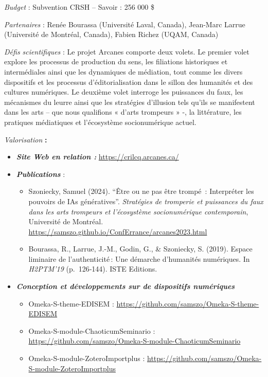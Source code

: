 \documentclass[
  a4paper,
  DIV=11,
  numbers=noendperiod]{scrreprt}
\begin{document}
\emph{Budget} : Subvention CRSH -- Savoir : 256 000 \$

\emph{Partenaires} : Renée Bourassa (Université Laval, Canada),
Jean-Marc Larrue (Université de Montréal, Canada), Fabien Richez (UQAM,
Canada)

\emph{Défis scientifiques} : Le projet Arcanes comporte deux volets. Le
premier volet explore les processus de production du sens, les
filiations historiques et intermédiales ainsi que les dynamiques de
médiation, tout comme les divers dispositifs et les processus
d'éditorialisation dans le sillon des humanités et des cultures
numériques. Le deuxième volet interroge les puissances du faux, les
mécanismes du leurre ainsi que les stratégies d'illusion tels qu'ils se
manifestent dans les arts -- que nous qualifions « d'arts trompeurs » -,
la littérature, les pratiques médiatiques et l'écosystème socionumérique
actuel.

\emph{Valorisation} \textbf{:}

\begin{itemize}
\item
  \textbf{\emph{Site Web en relation :}}
  \url{https://crilcq.arcanes.ca/}
\item
  \textbf{\emph{Publications}} :

  \begin{itemize}
  \item
    Szoniecky, Samuel (2024). ``Être ou ne pas être trompé \,:
    Interpréter les pouvoirs de IAs génératives''. \emph{Stratégies de
    tromperie et puissances du faux dans les arts trompeurs et
    l'écosystème socionumérique contemporain}, Université de Montréal.
    \url{https://samszo.github.io/ConfErrance/arcanes2023.html}
  \item
    Bourassa, R., Larrue, J.-M., Godin, G., \& Szoniecky, S. (2019).
    Espace liminaire de l'authenticité\,: Une démarche d'humanités
    numériques. In \emph{H2PTM'19} (p.~126‑144). ISTE Editions.
  \end{itemize}
\item
  \textbf{\emph{Conception et développements sur de dispositifs
  numériques}}

  \begin{itemize}
  \item
    Omeka-S-theme-EDISEM :
    \url{https://github.com/samszo/Omeka-S-theme-EDISEM}
  \item
    Omeka-S-module-ChaoticumSeminario :
    \url{https://github.com/samszo/Omeka-S-module-ChaoticumSeminario}
  \item
    Omeka-S-module-ZoteroImportplus :
    \url{https://github.com/samszo/Omeka-S-module-ZoteroImportplus}
  \end{itemize}
\end{itemize}
\end{document}
